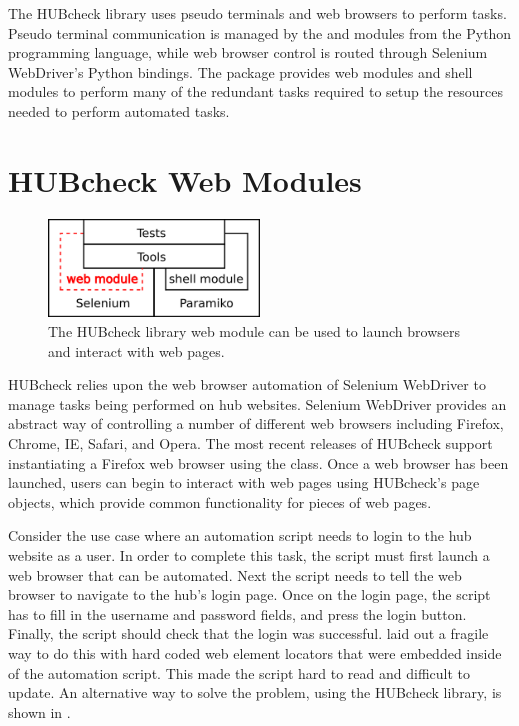 The HUBcheck library uses pseudo terminals and web browsers to perform tasks.
Pseudo terminal communication is managed by the  and
 modules from the Python programming language, while web
browser control is routed through Selenium WebDriver's Python bindings.  The
 package provides web modules and shell modules to perform
many of the redundant tasks required to setup the resources needed to perform
automated tasks.

\section{HUBcheck Web Modules}
\label{sec:hubcheck_web_modules}

\begin{figure}[tbh]
  \centering
  \includegraphics[width=0.5\textwidth]
    {../../images/hubcheck_block_diagram/hubcheck_library_overview_web_module.png}
  \caption{ The HUBcheck library web module can be used to launch browsers and interact with web pages. }
  \label{fig:hubzero_library_overview_web_module}
\end{figure}

HUBcheck relies upon the web browser automation of Selenium WebDriver to manage
tasks being performed on hub websites. Selenium WebDriver provides an abstract
way of controlling a number of different web browsers including Firefox,
Chrome, IE, Safari, and Opera. The most recent releases of HUBcheck support
instantiating a Firefox web browser using the  class. Once a
web browser has been launched, users can begin to interact with web pages using
HUBcheck's page objects, which provide common functionality for pieces of web
pages.


Consider the use case where an automation script needs to login to the hub
website as a user. In order to complete this task, the script must first launch
a web browser that can be automated. Next the script needs to tell the web
browser to navigate to the hub's login page. Once on the login page, the script
has to fill in the username and password fields, and press the login button.
Finally, the script should check that the login was successful.
 laid out a fragile way to do this with
hard coded web element locators that were embedded inside of the automation
script. This made the script hard to read and difficult to update. An
alternative way to solve the problem, using the HUBcheck library, is shown in
.

